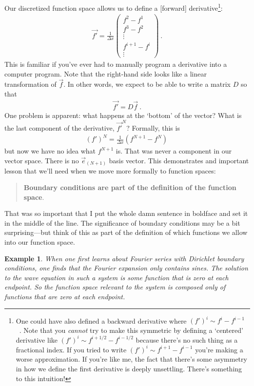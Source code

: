 \documentclass[
  11pt,
	colorful,
	raggedright,
]{tufte-style-thesis-flip}
\newtheorem{example}{Example}[section]
\begin{document}
Our discretized function space allows us to define a [forward] derivative\footnote{One could have also defined a backward derivative where $(f')^i \sim f^{i}-f^{i-1}$ \ . Note that you \emph{cannot} try to make this symmetric by defining a `centered' derivative like $(f')^i \sim f^{i+1/2}-f^{i-1/2}$ because there's no such thing as a fractional index. If you tried to write $(f')^i\sim f^{i+1}-f^{i-1}$ you're making a worse approximation. If you're like me, the fact that there's some asymmetry in how we define the first derivative is deeply unsettling. There's something to this intuition!}:
\begin{align}
  \vec{f'} =
  \frac{1}{\Delta x}
  \begin{pmatrix}
    f^2 - f^1 \\
    f^3 - f^2 \\
    \vdots
    \\
    f^{i+1}-f^i
    \\
    \vdots
  \end{pmatrix} \ .
\end{align}
This is familiar if you’ve ever had to manually program a derivative into a computer program. Note that the right-hand side looks like a linear transformation of $\vec{f}$. In other words, we expect to be able to write a matrix $D$ so that
\begin{align}
  \vec{f'} = D\vec{f} \ .
\end{align}
One problem is apparent: what happens at the `bottom’ of the vector? What is the last component of the derivative, $\vec{f'}^N$? Formally, this is
\begin{align}
  {(f')}^N = \frac{1}{\Delta x}(f^{N+1} - f^N) \,
\end{align}
but now we have no idea what $f^{N+1}$ is. That was never a component in our vector space. There is no $\vec{e}_{(N+1)}$ basis vector. 
%
This demonstrates and important lesson that we’ll need when we move more formally to function spaces:
\begin{quote}
\textbf{Boundary conditions are part of the definition of the function space}.   
\end{quote}
That was so important that I put the whole damn sentence in boldface and set it in the middle of the line. The significance of boundary conditions may be a bit surprising---but think of this as part of the definition of which functions we allow into our function space. 
%
\begin{example}
When one first learns about Fourier series with Dirichlet boundary conditions, one finds that the Fourier expansion \emph{only} contains sines. The solution to the wave equation in such a system is some function that is zero at each endpoint. So the function space relevant to the system is composed only of functions that are zero at each endpoint.
\end{example}
\end{document}

